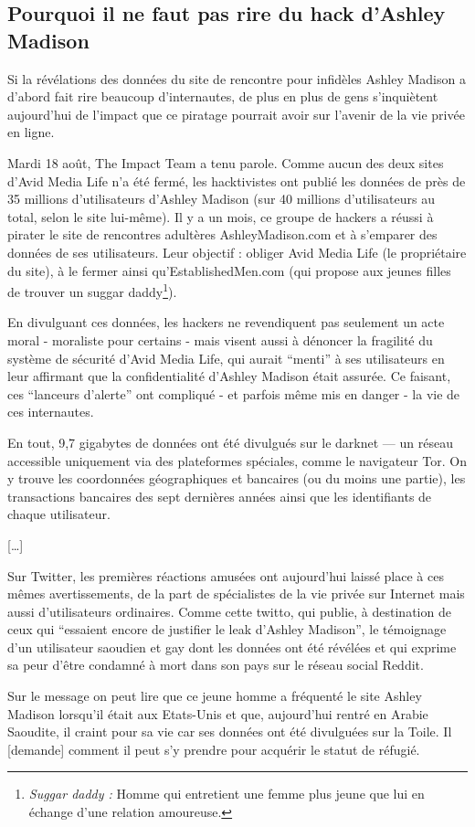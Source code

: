 \subsection*{Pourquoi il ne faut pas rire du hack d'Ashley Madison}

Si la révélations des données du site de rencontre pour infidèles Ashley Madison a d'abord fait rire beaucoup d'internautes, de plus en plus de gens s'inquiètent aujourd'hui de l'impact que ce piratage pourrait avoir sur l'avenir de la vie privée en ligne.

Mardi 18 août, The Impact Team a tenu parole. Comme aucun des deux sites d'Avid Media Life n'a été fermé, les hacktivistes ont publié les données de près de 35 millions d'utilisateurs d'Ashley Madison (sur 40 millions d'utilisateurs au total, selon le site lui-même). Il y a un mois, ce groupe de hackers a réussi à pirater le site de rencontres adultères AshleyMadison.com et à s'emparer des données de ses utilisateurs. Leur objectif : obliger Avid Media Life (le propriétaire du site), à le fermer ainsi qu'EstablishedMen.com (qui propose aux jeunes filles de trouver un suggar daddy\footnote{\emph{Suggar daddy :} Homme qui entretient une femme plus jeune que lui en échange d'une relation amoureuse.}). 

En divulguant ces données, les hackers ne revendiquent pas seulement un acte moral - moraliste pour certains - mais visent aussi à dénoncer la fragilité du système de sécurité d'Avid Media Life, qui aurait ``menti'' à ses utilisateurs en leur affirmant que la confidentialité d'Ashley Madison était assurée. Ce faisant, ces ``lanceurs d'alerte'' ont compliqué - et parfois même mis en danger - la vie de ces internautes.

En tout, 9,7 gigabytes de données ont été divulgués sur le darknet --- un réseau accessible uniquement via des plateformes spéciales, comme le navigateur Tor. On y trouve les coordonnées géographiques et bancaires (ou du moins une partie), les transactions bancaires des sept dernières années ainsi que les identifiants de chaque utilisateur.

[…]

Sur Twitter, les premières réactions amusées ont aujourd'hui laissé place à ces mêmes avertissements, de la part de spécialistes de la vie privée sur Internet mais aussi d'utilisateurs ordinaires. Comme cette twitto, qui publie, à destination de ceux qui ``essaient encore de justifier le leak d'Ashley Madison'', le témoignage d'un utilisateur saoudien et gay dont les données ont été révélées et qui exprime sa peur d'être condamné à mort dans son pays sur le réseau social Reddit.

Sur le message on peut lire que ce jeune homme a fréquenté le site Ashley Madison lorsqu'il était aux Etats-Unis et que, aujourd'hui rentré en Arabie Saoudite, il craint pour sa vie car ses données ont été divulguées sur la Toile. Il
[demande] %
comment il peut s'y prendre pour acquérir le statut de réfugié.
